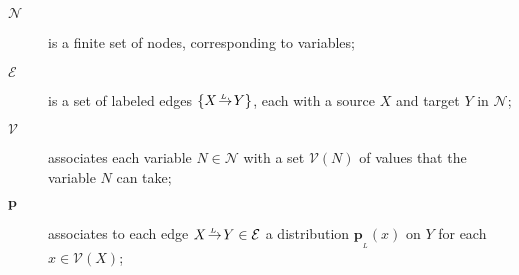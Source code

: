 \documentclass[letterpaper]{article} %
\theoremstyle{plain}
\theoremstyle{definition}
\theoremstyle{remark}
\newcommand{\notation}[1]{{\color{notationcolor} #1}}
\renewcommand{\notation}[1]{\ignorespaces} %
\newcommand\mat[1]{\mathbf{#1}}
\newcommand\Set{\mathbb{S}\mathrm{et}}
\newcommand{\bp}[1][L]{\mat{p}_{\!_{#1}\!}}
\newcommand{\V}{\mathcal V}
\newcommand{\N}{\mathcal N}
\newcommand{\Ed}{\mathcal E}
\newcommand{\Gr}{\mathcal G}
\newcommand{\ed}[3]{#2\!%
  \overset{\smash{\mskip-5mu\raisebox{-1pt}{$\scriptscriptstyle
        #1$}}}{\rightarrow}\! #3}
\begin{document}
\begin{defn}
%
\begin{description}%
	\item[$\N$] \notation{$:\Set$}%
		is a finite set of nodes, corresponding to variables;
	\item[$\Ed$] \notation{$\subseteq \N \times \N \times \mathit{Label}$}%
		is a set of labeled edges $\{ \ed LXY \}$, each with a source 
		$X$ and target $Y$ in $\N$;
	\item[$\V$] \notation{$\N \to \mathbf{Set}$}%
		associates each variable $N \in \N$ with a set $\V(N)$ of values that the variable $N$ can take;
  	\item[$\mat p$] \notation{$:\big(\!({A,B,\ell})\colon\!\Ed \big) \to \V(A) \to \Delta\V(B)$}%
	associates to each edge $\ed LXY \in \Ed$
	a distribution $\bp(x)$ on $Y$ for each $x \in \V(X)$; 


\end{description}
\end{defn}
\end{document}
